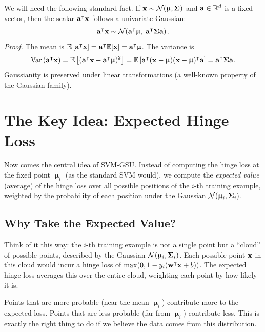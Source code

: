 \documentclass[11pt, letterpaper]{article}
\newcommand{\bSigma}{\vb{\Sigma}}
\newcommand{\bmu}{\boldsymbol{\upmu}}
\newcommand{\E}{\mathbb{E}}
\newcommand{\R}{\mathbb{R}}
\newcommand{\Norm}{\mathcal{N}}
\begin{document}
We will need the following standard fact. If $\vb{x} \sim \Norm(\bmu, \bSigma)$ and $\vb{a} \in \R^d$ is a fixed vector, then the scalar $\vb{a}^{\intercal}\vb{x}$ follows a univariate Gaussian:
\begin{equation}
    \vb{a}^{\intercal}\vb{x} \sim \Norm\!\left(\vb{a}^{\intercal}\bmu,\; \vb{a}^{\intercal}\bSigma\vb{a}\right).
\end{equation}
\emph{Proof.} The mean is $\E\left[\vb{a}^{\intercal}\vb{x}\right] = \vb{a}^{\intercal}\E[\vb{x}] = \vb{a}^{\intercal}\bmu$. The variance is
\begin{equation}
    \text{Var}\left(\vb{a}^{\intercal}\vb{x}\right) = \E\left[(\vb{a}^{\intercal}\vb{x} - \vb{a}^{\intercal}\bmu)^2\right] = \E\left[\vb{a}^{\intercal}(\vb{x}-\bmu)(\vb{x}-\bmu)^{\intercal}\vb{a}\right] = \vb{a}^{\intercal}\bSigma\vb{a}.
\end{equation}
Gaussianity is preserved under linear transformations (a well-known property of the Gaussian family).

\section{The Key Idea: Expected Hinge Loss}\label{sec:expected_hinge}

Now comes the central idea of SVM-GSU. Instead of computing the hinge loss at the fixed point $\bmu_i$ (as the standard SVM would), we compute the \emph{expected value} (average) of the hinge loss over all possible positions of the $i$-th training example, weighted by the probability of each position under the Gaussian $\Norm(\bmu_i, \bSigma_i)$.

\subsection{Why Take the Expected Value?}

Think of it this way: the $i$-th training example is not a single point but a ``cloud'' of possible points, described by the Gaussian $\Norm(\bmu_i, \bSigma_i)$. Each possible point $\vb{x}$ in this cloud would incur a hinge loss of $\max(0, 1 - y_i(\vb{w}^{\intercal} \vb{x} + b))$. The expected hinge loss averages this over the entire cloud, weighting each point by how likely it is.

Points that are more probable (near the mean $\bmu_i$) contribute more to the expected loss. Points that are less probable (far from $\bmu_i$) contribute less. This is exactly the right thing to do if we believe the data comes from this distribution.
\end{document}

